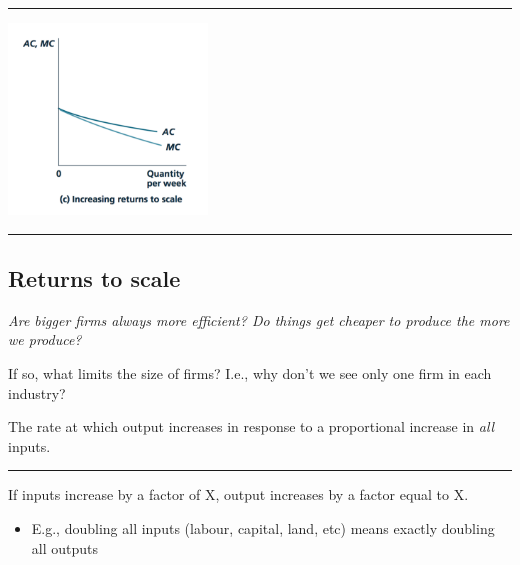 \documentclass[]{article}
\providecommand{\tightlist}{%
  \setlength{\itemsep}{0pt}\setlength{\parskip}{0pt}}
\begin{document}
\begin{center}\rule{0.5\linewidth}{\linethickness}\end{center}

\includegraphics[height=2in]{picsfigs/irscosts_fix.png}

\begin{center}\rule{0.5\linewidth}{\linethickness}\end{center}

\hypertarget{returns-to-scale}{%
\subsection{Returns to scale}\label{returns-to-scale}}

\emph{Are bigger firms always more efficient? Do things get cheaper to
produce the more we produce?}

If so, what limits the size of firms? I.e., why don't we see only one
firm in each industry?

\begin{description}
\tightlist
\item[Returns to scale]
The rate at which output increases in response to a proportional
increase in \emph{all} inputs.
\end{description}

\begin{center}\rule{0.5\linewidth}{\linethickness}\end{center}

\begin{description}
\tightlist
\item[Constant returns to scale (CRS)]
If inputs increase by a factor of X, output increases by a factor equal
to X.
\end{description}

\begin{itemize}
\tightlist
\item
  E.g., doubling all inputs (labour, capital, land, etc) means exactly
  doubling all outputs
\end{itemize}
\end{document}
